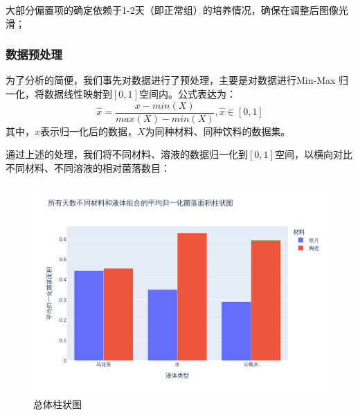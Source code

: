 \documentclass[12pt,a4paper]{ctexart}
\begin{document}
大部分偏置项的确定依赖于1-2天（即正常组）的培养情况，确保在调整后图像光滑；



\subsubsection{数据预处理}
为了分析的简便，我们事先对数据进行了预处理，主要是对数据进行Min-Max 归一化，将数据线性映射到$[0,1]$空间内。公式表达为：
\begin{equation}
    \hat{x}=\frac{x−min(X)​}{max(X)−min(X)},\hat{x} \in [0,1]
\end{equation}
其中，$\hat{x}$表示归一化后的数据，$X$为同种材料、同种饮料的数据集。

通过上述的处理，我们将不同材料、溶液的数据归一化到$[0,1]$空间，以横向对比不同材料、不同溶液的相对菌落数目：
\begin{figure}[H]  %
    \centering  %
    \includegraphics[width=\textwidth]{./plot/General/bar_normalized_overall.png}  %
    \caption{总体柱状图}  %
    \label{fig:GeneralBarFront}  %
\end{figure}
\end{document}
